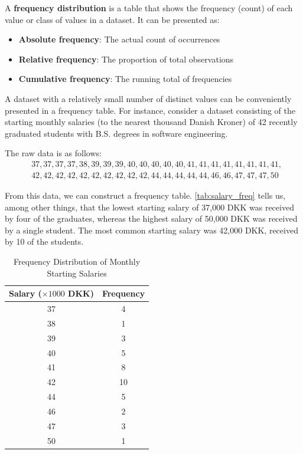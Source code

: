 \begin{definition}
A \textbf{frequency distribution} is a table that shows the frequency (count) of each value or class of values in a dataset. It can be presented as:
\begin{itemize}
    \item \textbf{Absolute frequency}: The actual count of occurrences
    \item \textbf{Relative frequency}: The proportion of total observations
    \item \textbf{Cumulative frequency}: The running total of frequencies
\end{itemize}
\end{definition}

\begin{example}
A dataset with a relatively small number of distinct values can be conveniently presented in a frequency table. For instance, consider a dataset consisting of the starting monthly salaries (to the nearest thousand Danish Kroner) of 42 recently graduated students with B.S. degrees in software engineering.

The raw data is as follows:
\[
\begin{aligned}
&37, 37, 37, 37, 38, 39, 39, 39, 40, 40, 40, 40, 40, 41, 41, 41, 41, 41, 41, 41, 41, \\
&42, 42, 42, 42, 42, 42, 42, 42, 42, 42, 44, 44, 44, 44, 44, 46, 46, 47, 47, 47, 50
\end{aligned}
\]

From this data, we can construct a frequency table. \autoref{tab:salary_freq} tells us, among other things, that the lowest starting salary of 37,000 DKK was received by four of the graduates, whereas the highest salary of 50,000 DKK was received by a single student. The most common starting salary was 42,000 DKK, received by 10 of the students.

\begin{table}[htbp]
\centering
\renewcommand{\arraystretch}{1.2}
{
\begin{tabular}{cc}
\toprule
\textbf{Salary (\(\times 1000\) DKK)} & \textbf{Frequency} \\
\midrule
37 & 4 \\
38 & 1 \\
39 & 3 \\
40 & 5 \\
41 & 8 \\
42 & 10 \\
44 & 5 \\
46 & 2 \\
47 & 3 \\
50 & 1 \\
\bottomrule
\end{tabular}
}
\caption{Frequency Distribution of Monthly Starting Salaries}
\label{tab:salary_freq}
\end{table}
\end{example}

